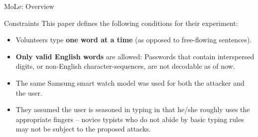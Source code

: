 \documentclass[ucs,9pt]{beamer}
\begin{document}
\begin{frame}{MoLe: Overview}
	
\end{frame}


\begin{frame}{Constraints}
	This paper defines the following conditions for their experiment:
	\begin{itemize}
		\item Volunteers type \textbf{one word at a time} (as opposed to free-flowing
		sentences).
		\item \textbf{Only valid English words} are allowed: Passwords that contain interspersed digits, or non-English character-sequences, are not decodable as of now.
		\item  The same Samsung smart watch model was used for both
		the attacker and the user.
		\item They assumed the user is seasoned in typing in that he/she roughly
		uses the appropriate fingers – novice typists who do not abide by
		basic typing rules may not be subject to the proposed attacks.
	\end{itemize}
\end{frame}
\end{document}
